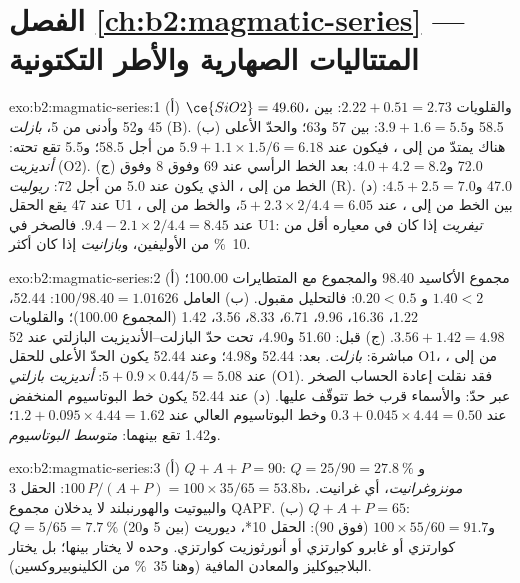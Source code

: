 \section*{الفصل \ref{ch:b2:magmatic-series} --- المتتاليات الصهارية والأطر التكتونية}

\begin{solution}{exo:b2:magmatic-series:1}
(أ) $\ce{SiO2} = 49.60$، والقلويات $2.22 + 0.51 = 2.73$: بين 45 و52 وأدنى من 5،
\emph{بازلت} (B). (ب) 58.5 و$3.9 + 1.6 = 5.5$: بين 57 و63؛ والحدّ
الأعلى هناك يمتدّ من  إلى ، فيكون عند $5.9 + 1.1\times1.5/6 = 6.18$
من أجل 58.5؛ و5.5 تقع تحته: \emph{أنديزيت} (O2). (ج) 72.0 و$4.0 + 4.2 = 8.2$:
بعد الخط الرأسي عند 69 وفوق 8 وفوق الخط من  إلى ، الذي يكون
عند 5.0 من أجل 72: \emph{ريوليت} (R). (د) 47.0 و$4.5 + 2.5 = 7.0$: عند 47 يقع الحقل U1
بين الخط من  إلى ، عند $5 + 2.3\times2/4.4 = 6.05$،
والخط من  إلى ، عند $9.4 - 2.1\times2/4.4 = 8.45$. فالصخر
في U1: \emph{تيفريت} إذا كان في معياره أقل من \qty{10}{\percent} من الأوليفين،
و\emph{بازانيت} إذا كان أكثر.
\end{solution}

\begin{solution}{exo:b2:magmatic-series:2}
(أ) مجموع الأكاسيد 98.40 والمجموع مع المتطايرات 100.00؛
 $1.40 < 2$ و $0.20 < 0.5$: فالتحليل مقبول. (ب) العامل
$100/98.40 = 1.01626$:  52.44،  1.22،  16.36،
 9.96،  6.71،  8.33،  3.56،  1.42
(المجموع 100.00)؛ والقلويات $3.56 + 1.42 = 4.98$. (ج) قبل: 51.60 و4.90، تحت
حدّ البازلت--الأنديزيت البازلتي عند 52 مباشرة: \emph{بازلت}. بعد: 52.44 و4.98؛ وعند
52.44 يكون الحدّ الأعلى للحقل O1، من  إلى ، عند $5 + 0.9\times0.44/5
= 5.08$: \emph{أنديزيت بازلتي} (O1). فقد نقلت إعادة الحساب الصخر عبر
حدّ: والأسماء قرب خط تتوقّف عليها. (د) عند 52.44 يكون خط البوتاسيوم المنخفض عند $0.3 +
0.045\times4.44 = 0.50$ وخط البوتاسيوم العالي عند $1.2 + 0.095\times4.44 = 1.62$؛ و1.42
تقع بينهما: \emph{متوسط البوتاسيوم}.
\end{solution}

\begin{solution}{exo:b2:magmatic-series:3}
(أ) $Q + A + P = 90$: $Q = 25/90 = \qty{27.8}{\percent}$ و$100\,P/(A + P) =
100\times35/65 = 53.8$: الحقل 3b، \emph{مونزوغرانيت}، أي غرانيت. والبيوتيت
والهورنبلند لا يدخلان مجموع QAPF. (ب) $Q + A + P = 65$: $Q = 5/65 =
\qty{7.7}{\percent}$ (بين 5 و20) و$100\times55/60 = 91.7$ (فوق 90): الحقل
10*، ديوريت كوارتزي أو غابرو كوارتزي أو أنورثوزيت كوارتزي.  وحده لا
يختار بينها؛ بل يختار البلاجيوكليز والمعادن المافية (وهنا
\qty{35}{\percent} من الكلينوبيروكسين).
\end{solution}

